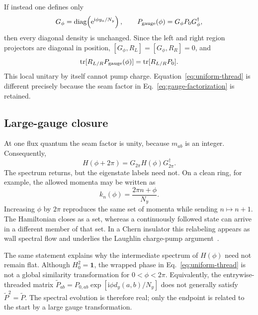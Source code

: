 \documentclass[aps,prb,twocolumn,floatfix,nofootinbib,superscriptaddress]{revtex4-2}
\newcommand{\ii}{\mathrm{i}}
\newcommand{\tr}{\operatorname{tr}}
\newcommand{\e}{\mathrm{e}}
\begin{document}
If instead one defines only
\begin{equation}
 G_\phi=\operatorname{diag}\!\left(\e^{\ii\phi y_a/N_y}\right),
 \qquad P_{\rm gauge}(\phi)=G_\phi P_0G_\phi^\dagger,
 \label{eq:pure-gauge}
\end{equation}
then every diagonal density is unchanged.  Since the left and right region
projectors are diagonal in position, $[G_\phi,R_L]=[G_\phi,R_R]=0$, and
\begin{equation}
 \tr[R_{L/R}P_{\rm gauge}(\phi)]=\tr[R_{L/R}P_0].
 \label{eq:gauge-no-charge}
\end{equation}
This local unitary by itself cannot pump charge.  Equation~\eqref{eq:uniform-thread}
is different precisely because the seam factor in Eq.~\eqref{eq:gauge-factorization}
is retained.

\subsection{Large-gauge closure}

At one flux quantum the seam factor is unity, because $m_{ab}$ is an integer.
Consequently,
\begin{equation}
 H(\phi+2\pi)=G_{2\pi}H(\phi)G_{2\pi}^\dagger .
 \label{eq:large-gauge}
\end{equation}
The spectrum returns, but the eigenstate labels need not.  On a clean ring,
for example, the allowed momenta may be written as
\begin{equation}
 k_n(\phi)=\frac{2\pi n+\phi}{N_y}.
 \label{eq:ring-momenta}
\end{equation}
Increasing $\phi$ by $2\pi$ reproduces the same set of momenta while sending
$n\mapsto n+1$.  The Hamiltonian closes as a set, whereas a continuously
followed state can arrive in a different member of that set.  In a Chern
insulator this relabeling appears as wall spectral flow and underlies the
Laughlin charge-pump argument~\cite{Laughlin1981,NiuThouless1984,Hatsugai1993}.

The same statement explains why the intermediate spectrum of $H(\phi)$ need
not remain flat.  Although $H_0^2=\mathbf{1}$, the wrapped phase in
Eq.~\eqref{eq:uniform-thread} is not a global similarity transformation for
$0<\phi<2\pi$.  Equivalently, the entrywise-threaded matrix
$\widetilde P_{ab}=P_{0,ab}\exp[\ii\phi d_y(a,b)/N_y]$ does not generally
satisfy $\widetilde P^2=\widetilde P$.  The spectral evolution is therefore
real; only the endpoint is related to the start by a large gauge
transformation.
\end{document}
